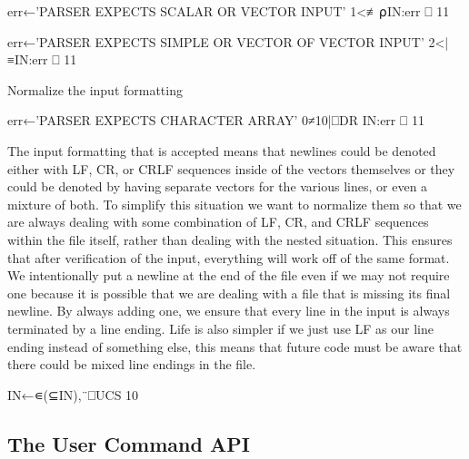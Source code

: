 \documentclass{article}%
\begin{document}
err←'PARSER EXPECTS SCALAR OR VECTOR INPUT'
1<≢⍴IN:err ⎕ 11

err←'PARSER EXPECTS SIMPLE OR VECTOR OF VECTOR INPUT'
2<|≡IN:err ⎕ 11

\LA{}Normalize the input formatting~{\nwtagstyle{}}\RA{}

err←'PARSER EXPECTS CHARACTER ARRAY'
0≠10|⎕DR IN:err ⎕ 11
\nwendcode{}\nwdocspar

The input formatting that is accepted means that newlines could be
denoted either with {\Tt{}LF\nwendquote}, {\Tt{}CR\nwendquote}, or {\Tt{}CRLF\nwendquote}
sequences inside of the vectors
themselves or they could be denoted by having separate vectors
for the various lines,
or even a mixture of both.
To simplify this situation we want to normalize them so that we are
always dealing with some combination of {\Tt{}LF\nwendquote}, {\Tt{}CR\nwendquote}, and {\Tt{}CRLF\nwendquote}
sequences
within the file itself, rather than dealing with the nested
situation.
This ensures that after verification of the input,
everything will work off of the same format.
We intentionally put a newline at the end of the file even if we
may not require one because it is possible that we are dealing
with a file that is missing its final newline.
By always adding one, we ensure that every line in the input
is always terminated by a line ending.
Life is also simpler if we just use LF as our line ending instead
of something else,
this means that future code must be aware that there could be mixed
line endings in the file.

\nwenddocs{}\endmoddef\nwstartdeflinemarkup{}\nwenddeflinemarkup
IN←∊(⊆IN),¨⎕UCS 10
\nwendcode{}\nwdocspar

\subsection{The User Command API}
\end{document}
